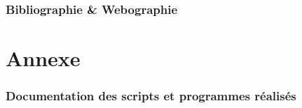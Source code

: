 \documentclass[a4paper, 11pt]{article}
\begin{document}
\newpage
\thispagestyle{plain}

\section*{Bibliographie \& Webographie}

\nocite{*}



\appendix
\newpage
{}
\part{Annexe}

\section{Documentation des scripts et programmes réalisés}
\end{document}
